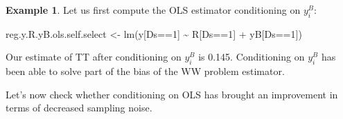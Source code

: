 \documentclass[
]{book}
\newenvironment{Shaded}{\begin{snugshade}}{\end{snugshade}}
\newcommand{\DecValTok}[1]{\textcolor[rgb]{0.00,0.00,0.81}{#1}}
\newcommand{\FunctionTok}[1]{\textcolor[rgb]{0.00,0.00,0.00}{#1}}
\newcommand{\NormalTok}[1]{#1}
\newcommand{\OtherTok}[1]{\textcolor[rgb]{0.56,0.35,0.01}{#1}}
\newcommand{\SpecialCharTok}[1]{\textcolor[rgb]{0.00,0.00,0.00}{#1}}
\theoremstyle{definition}
\theoremstyle{definition}
\newtheorem{example}{Example}[chapter]
\theoremstyle{definition}
\theoremstyle{definition}
\theoremstyle{remark}
\begin{document}
\begin{example}
\protect\hypertarget{exm:unnamed-chunk-85}{}{\label{exm:unnamed-chunk-85} }Let us first compute the OLS estimator conditioning on \(y_i^B\):
\end{example}

\begin{Shaded}
\begin{Highlighting}[]
\NormalTok{reg.y.R.yB.ols.self.select }\OtherTok{\textless{}{-}} \FunctionTok{lm}\NormalTok{(y[Ds}\SpecialCharTok{==}\DecValTok{1}\NormalTok{] }\SpecialCharTok{\textasciitilde{}}\NormalTok{ R[Ds}\SpecialCharTok{==}\DecValTok{1}\NormalTok{] }\SpecialCharTok{+}\NormalTok{ yB[Ds}\SpecialCharTok{==}\DecValTok{1}\NormalTok{])}
\end{Highlighting}
\end{Shaded}

Our estimate of TT after conditioning on \(y_i^B\) is 0.145.
Conditioning on \(y_i^B\) has been able to solve part of the bias of the WW problem estimator.

Let's now check whether conditioning on OLS has brought an improvement in terms of decreased sampling noise.
\end{document}
